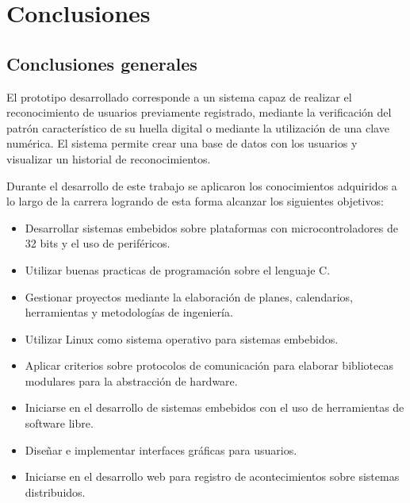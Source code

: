 
\chapter{Conclusiones} %

\label{Chapter5} %




\section{Conclusiones generales }

El prototipo desarrollado corresponde a un sistema capaz de realizar el reconocimiento de usuarios previamente registrado, mediante la verificación del patrón característico de su huella digital o mediante la utilización de una clave numérica. El sistema permite crear una base de datos con los usuarios y visualizar un historial de reconocimientos.

Durante el desarrollo de este trabajo se aplicaron los conocimientos adquiridos a lo largo de la carrera logrando de esta forma alcanzar los siguientes objetivos:

\begin{itemize}
\item Desarrollar sistemas embebidos sobre plataformas con microcontroladores de 32 bits y el uso de periféricos.

\item Utilizar buenas practicas de programación sobre el lenguaje C.

\item Gestionar proyectos mediante la elaboración de planes, calendarios, herramientas y metodologías de ingeniería.

\item Utilizar Linux como sistema operativo para sistemas embebidos.

\item Aplicar criterios sobre protocolos de comunicación para elaborar bibliotecas modulares para la abstracción de hardware.

\item Iniciarse en el desarrollo de sistemas embebidos con el uso de herramientas de software libre.

\item Diseñar e implementar interfaces gráficas para usuarios.

\item Iniciarse en el desarrollo web para registro de acontecimientos sobre sistemas distribuidos.
\end{itemize}

